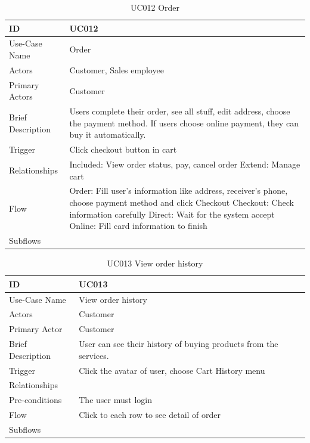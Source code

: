 \begin{table}
\begin{tabular}{|>{\raggedright\arraybackslash}p{5cm}|>{\raggedright\arraybackslash}p{10cm}|}
\hline
ID& UC012 \\
\hline
Use-Case Name& Order\\
\hline
Actors& Customer, Sales employee \\
\hline
Primary Actors& Customer \\
\hline
Brief Description& Users complete their order, see all stuff, edit address, choose the payment method. If users choose online payment, they can buy it automatically.\\
\hline
Trigger& Click checkout button in cart\\
\hline
Relationships& Included: View order status, pay, cancel order \break
Extend: Manage cart
\\
\hline
Flow& Order: Fill user’s information like address, receiver’s phone, choose payment method and click Checkout \break
Checkout: Check information carefully \break
Direct: Wait for the system accept \break
Online: Fill card information to finish\\
\hline
Subflows& \\
\hline
\end{tabular}
\caption{UC012 Order}
\label{tab:UC012}
\end{table}
\begin{table}
\begin{tabular}{|>{\raggedright\arraybackslash}p{5cm}|>{\raggedright\arraybackslash}p{10cm}|}
\hline
ID& UC013 \\
\hline
Use-Case Name& View order history\\
\hline
Actors& Customer\\
\hline
Primary Actor& Customer\\
\hline
Brief Description& User can see their history of buying products from the services.\\
\hline
Trigger& Click the avatar of user, choose Cart History menu\\
\hline
Relationships& \\
\hline
Pre-conditions& The user must login\\
\hline
Flow& Click to each row to see detail of order\\
\hline
Subflows& \\
\hline
\end{tabular}
\caption{UC013 View order history}
\label{tab:UC013}
\end{table}

